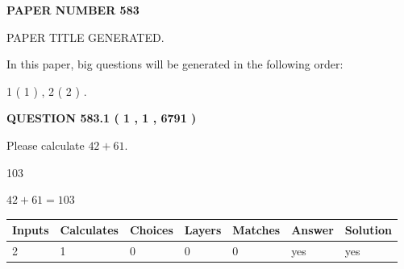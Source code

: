 \documentclass[12pt]{article}
\begin{document}
   
 {\textbf{ \Large{ PAPER NUMBER  583  }}}
   
   
\vspace{0.2in}
   
   
   
   
   
   
   
   
 \vspace{0.2in}
 
 
 
 
   
   
 PAPER TITLE GENERATED.
   
   
   
\vspace{0.2in}
   
In this paper, big questions will be generated in the following order: 
   
   
   1 ( 1 )
 ,
   2 ( 2 )
 .
  
\vspace{0.2in}
  
{\textbf{\Large{QUESTION
583.1 
 ( 1 , 1 , 6791 )
}}}
  
  
 
Please calculate $ %
42 +  %
61 $.
 
 
 
\noindent{}
 
 

103
 
 
\noindent{}
 
 

 
 
 
\noindent{}
 
 

$ %
42 +  %
61=   %
103$
 
 
\noindent{}
 
 

 
   
   
   
   
\noindent\begin{tabular}{|l|l|l|l|l|l|l|}
 \hline
Inputs & Calculates & Choices & Layers & Matches & Answer & Solution \\ \hline
 2  & 
 1  & 
 0
  & 
 0  & 
 0  & 
  yes & 
  yes 
  \\ \hline
 \end{tabular}
   
\end{document}
